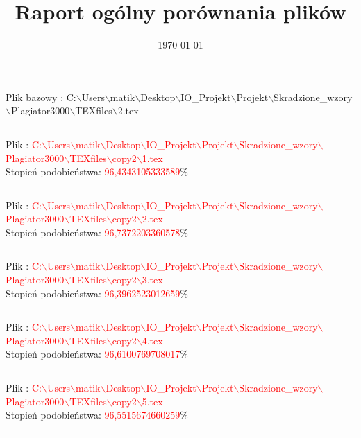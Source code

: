 \documentclass{article}
\begin{document}
\title{\huge\bfseries Raport ogólny porównania plików }
\date{\today}
\maketitle
\begin{flushleft}
Plik bazowy : C:$\backslash$Users$\backslash$matik$\backslash$Desktop$\backslash$IO\_Projekt$\backslash$Projekt$\backslash$Skradzione\_wzory$\backslash$Plagiator3000$\backslash$TEXfiles$\backslash$2.tex
\end{flushleft}
\hrule
\begin{flushleft}
Plik : \textcolor{Red}{C:$\backslash$Users$\backslash$matik$\backslash$Desktop$\backslash$IO\_Projekt$\backslash$Projekt$\backslash$Skradzione\_wzory$\backslash$Plagiator3000$\backslash$TEXfiles$\backslash$copy2$\backslash$1.tex}\\
{\huge Stopień podobieństwa: \textcolor{Red}{96,4343105333589}\%} \\ 

\end{flushleft}
\hrule
\begin{flushleft}
Plik : \textcolor{Red}{C:$\backslash$Users$\backslash$matik$\backslash$Desktop$\backslash$IO\_Projekt$\backslash$Projekt$\backslash$Skradzione\_wzory$\backslash$Plagiator3000$\backslash$TEXfiles$\backslash$copy2$\backslash$2.tex}\\
{\huge Stopień podobieństwa: \textcolor{Red}{96,7372203360578}\%} \\ 

\end{flushleft}
\hrule
\begin{flushleft}
Plik : \textcolor{Red}{C:$\backslash$Users$\backslash$matik$\backslash$Desktop$\backslash$IO\_Projekt$\backslash$Projekt$\backslash$Skradzione\_wzory$\backslash$Plagiator3000$\backslash$TEXfiles$\backslash$copy2$\backslash$3.tex}\\
{\huge Stopień podobieństwa: \textcolor{Red}{96,3962523012659}\%} \\ 

\end{flushleft}
\hrule
\begin{flushleft}
Plik : \textcolor{Red}{C:$\backslash$Users$\backslash$matik$\backslash$Desktop$\backslash$IO\_Projekt$\backslash$Projekt$\backslash$Skradzione\_wzory$\backslash$Plagiator3000$\backslash$TEXfiles$\backslash$copy2$\backslash$4.tex}\\
{\huge Stopień podobieństwa: \textcolor{Red}{96,6100769708017}\%} \\ 

\end{flushleft}
\hrule
\begin{flushleft}
Plik : \textcolor{Red}{C:$\backslash$Users$\backslash$matik$\backslash$Desktop$\backslash$IO\_Projekt$\backslash$Projekt$\backslash$Skradzione\_wzory$\backslash$Plagiator3000$\backslash$TEXfiles$\backslash$copy2$\backslash$5.tex}\\
{\huge Stopień podobieństwa: \textcolor{Red}{96,5515674660259}\%} \\ 

\end{flushleft}
\hrule
\end{document}
